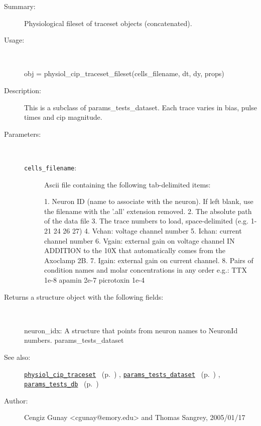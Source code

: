 \begin{description}
\item[Summary:]Physiological fileset of traceset objects (concatenated).
%
\item[Usage:]~%
\begin{lyxcode}%
obj = physiol\_cip\_traceset\_fileset(cells\_filename, dt, dy, props)
%
\end{lyxcode}%
%
\item[Description:]%
This is a subclass of params\_tests\_dataset. Each trace varies in bias, 
 pulse times and cip magnitude.
\item[Parameters:]~
\begin{description}%
\item[\texttt{cells\_filename}:]
 Ascii file containing the following tab-delimited items:

1. Neuron ID (name to associate with the neuron). If left blank, use
the filename with the '.all' extension removed.
2. The absolute path of the data file
3. The trace numbers to load, space-delimited (e.g. 1-21 24 26 27)
4. Vchan: voltage channel number
5. Ichan: current channel number
6. Vgain: external gain on voltage channel IN ADDITION to the 10X that
automatically comes from the Axoclamp 2B.
7. Igain: external gain on current channel.
8. Pairs of condition names and molar concentrations in any order
e.g.: TTX       1e-8    apamin  2e-7    picrotoxin      1e-4\end{description}%
%
\item[Returns a structure object with the following fields:]~

	neuron\_idx: A structure that points from neuron names to NeuronId numbers.
	params\_tests\_dataset
%
%
\item[See also:]%
\hyperlink{ref_physiol_cip_traceset}{\texttt{physiol\_cip\_traceset}}%
\ (p.~\pageref{ref_physiol_cip_traceset})%
%
, \hyperlink{ref_params_tests_dataset}{\texttt{params\_tests\_dataset}}%
\ (p.~\pageref{ref_params_tests_dataset})%
%
, \hyperlink{ref_params_tests_db}{\texttt{params\_tests\_db}}%
\ (p.~\pageref{ref_params_tests_db})%
%
%
\item[Author:]%
Cengiz Gunay <cgunay@emory.edu> and Thomas Sangrey, 2005/01/17%
\end{description}
\methodline%
